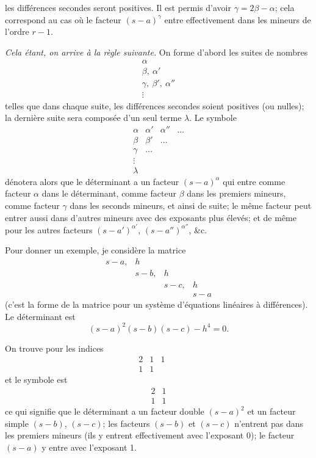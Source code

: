 \documentclass[11pt,a4paper]{book}
\begin{document}
\newpage
\setcounter{page}{217}

les diff\'{e}rences secondes seront positives. Il est permis d'avoir $\gamma = 2\beta - \alpha$; cela correspond au cas o\`{u} le facteur $(s-a)^{\gamma}$ entre effectivement dans les mineurs de l'ordre $r-1$.

\textit{Cela \'{e}tant, on arrive \`{a} la r\`{e}gle suivante.} On forme d'abord les suites de nombres
\[
\begin{array}{c}
\alpha \\
\beta,\ \alpha' \\
\gamma,\ \beta',\ \alpha'' \\
\vdots
\end{array}
\]
telles que dans chaque suite, les diff\'{e}rences secondes soient positives (ou nulles); la derni\`{e}re suite sera compos\'{e}e d'un seul terme $\lambda$. Le symbole
\[
\begin{array}{cccc}
\alpha & \alpha' & \alpha'' & \ldots \\
\beta & \beta' & \ldots & \\
\gamma & \ldots & & \\
\vdots & & & \\
\lambda & & &
\end{array}
\]
d\'{e}notera alors que le d\'{e}terminant a un facteur $(s-a)^{\alpha}$ qui entre comme facteur $\alpha$ dans le d\'{e}terminant, comme facteur $\beta$ dans les premiers mineurs, comme facteur $\gamma$ dans les seconds mineurs, et ainsi de suite; le m\^{e}me facteur peut entrer aussi dans d'autres mineurs avec des exposants plus \'{e}lev\'{e}s; et de m\^{e}me pour les autres facteurs $(s-a')^{\alpha'}$, $(s-a'')^{\alpha''}$, \&c.

Pour donner un exemple, je consid\`{e}re la matrice
\[
\begin{matrix}
s-a, & h & & \\
& s-b, & h & \\
& & s-c, & h \\
& & & s-a
\end{matrix}
\]
(c'est la forme de la matrice pour un syst\`{e}me d'\'{e}quations lin\'{e}aires \`{a} diff\'{e}rences). Le d\'{e}terminant est
\[
(s-a)^2(s-b)(s-c) - h^4 = 0.
\]

\newpage
\setcounter{page}{218}

On trouve pour les indices
\[
\begin{array}{ccccc}
2 & 1 & 1 & & \\
1 & 1 & & &
\end{array}
\]
et le symbole est
\[
\begin{array}{cc}
2 & 1 \\
1 & 1
\end{array}
\]
ce qui signifie que le d\'{e}terminant a un facteur double $(s-a)^2$ et un facteur simple $(s-b)$, $(s-c)$; les facteurs $(s-b)$ et $(s-c)$ n'entrent pas dans les premiers mineurs (ils y entrent effectivement avec l'exposant 0); le facteur $(s-a)$ y entre avec l'exposant 1.
\end{document}

